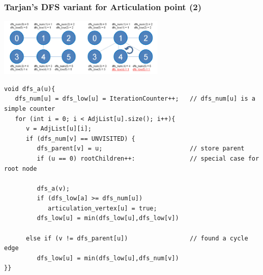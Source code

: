 \documentclass{beamer}
\begin{document}
\begin{frame}
  \frametitle{Tarjan's DFS variant for Articulation point (2)}
  \begin{center}
    \includegraphics[width=0.6\textwidth]{../img/graph_articulation}
  \end{center}
  
{\tiny
  \begin{exampleblock}{}
\begin{verbatim}
void dfs_a(u){
   dfs_num[u] = dfs_low[u] = IterationCounter++;   // dfs_num[u] is a simple counter
   for (int i = 0; i < AdjList[u].size(); i++){
      v = AdjList[u][i];
      if (dfs_num[v] == UNVISITED) {
         dfs_parent[v] = u;                        // store parent
         if (u == 0) rootChildren++:               // special case for root node

         dfs_a(v);
         if (dfs_low[a] >= dfs_num[u])
            articulation_vertex[u] = true;
         dfs_low[u] = min(dfs_low[u],dfs_low[v])

      else if (v != dfs_parent[u])                 // found a cycle edge
         dfs_low[u] = min(dfs_low[u],dfs_num[v])
}}
\end{verbatim}
  \end{exampleblock}}
\end{frame}
\end{document}
